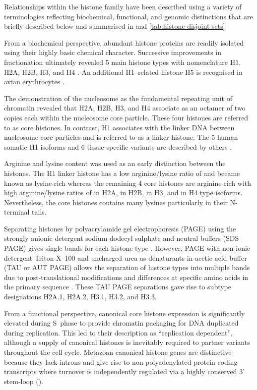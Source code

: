   Relationships within the histone family have been described using a variety of terminologies
  reflecting biochemical, functional, and genomic distinctions that are briefly described below
  and summarised in  and \ref{tab:histone-disjoint-sets}.

  From a biochemical perspective, abundant histone proteins
  are readily isolated using their highly basic chemical character.
  Successive improvements in fractionation ultimately revealed 5 main histone types
  with nomenclature H1, H2A, H2B, H3, and H4 \citep{nomenclature}.
  An additional H1--related histone H5 is recognised in avian erythrocytes \citep{HFive-review}.

  The demonstration of the nucleosome as the fundamental
  repeating unit of chromatin \citep{Kornberg1974}
  revealed that H2A, H2B, H3, and H4 associate as an octamer of two copies each within the
  nucleosome core particle. These four histones are referred to as core histones.
  In contrast, H1 associates with the linker DNA between nucleosome core particles
  and is referred to as a linker histone.
  The 5 human somatic H1 isoforms and 6 tissue-specific
  variants are described by others \citep{HarshmanFreitas2013}.

  Arginine and lysine content was used as an early distinction between the histones.
  The H1 linker histone has a low arginine/lysine ratio
  of \LinkerArgLysRatio{} and became known as lysine-rich
  whereas the remaining 4 core histones are arginine-rich
  with high arginine/lysine ratios of \HTwoAArgLysRatio{} in H2A, \HTwoBArgLysRatio{} in H2B,
  \HThreeArgLysRatio{} in H3, and \HFourArgLysRatio{} in H4 type isoforms.
  Nevertheless, the core histones contains many lysines particularly in their N-terminal tails.

  Separating histones by polyacrylamide gel electrophoresis (PAGE)
  using the strongly anionic detergent sodium dodecyl sulphate and neutral buffers (SDS PAGE)
  gives single bands for each histone type \citep{ShechterHake2007}.
  However, PAGE with non-ionic detergent Triton X--100 and uncharged urea as denaturants
  in acetic acid buffer (TAU or AUT PAGE) allows the separation
  of histone types into multiple bands
  due to post-translational modifications and differences at specific amino acids
  in the primary sequence \citep{Zweidler1977}.
  These TAU PAGE separations gave rise to subtype designations H2A.1, H2A.2, H3.1, H3.2, and H3.3.

  From a functional perspective, canonical core histone expression
  is significantly elevated during S~phase to provide chromatin packaging
  for DNA duplicated during replication.
  This led to their description as ``replication dependent'',
  although a supply of canonical histones is inevitably required
  to partner variants throughout the cell cycle.
  Metazoan canonical histone genes are distinctive
  because they lack introns and give rise to non-polyadenylated protein coding transcripts
  where turnover is independently regulated via a highly
  conserved 3' stem-loop ().

